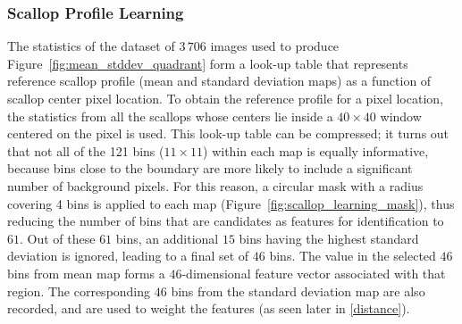 \documentclass {udthesis}
\begin{document}
\subsubsection{Scallop Profile Learning} \label{subsubsec:scallop_profile_learning}

The statistics of the dataset of $3\,706$ images used to produce Figure~\ref{fig:mean_stddev_quadrant} form a look-up table that represents reference scallop profile (mean and standard deviation maps) 
as a function of scallop center pixel location.
To obtain the reference profile for a pixel location, 
the statistics from all the scallops whose centers lie inside a $40\times40$ window centered on the pixel is used.
This look-up table can be compressed; it turns out that not all of the 121 bins ($11\times11$) within each map is equally informative, because bins close to the boundary are more likely to include a significant number of background pixels.
For this reason, a circular mask with a radius covering 4 bins is applied to each map (Figure~\ref{fig:scallop_learning_mask}), thus reducing the number of bins that are candidates as features for identification to $61$.
Out of these $61$ bins, an additional $15$ bins having the highest standard deviation is ignored, leading to a final set of $46$ bins.
The value in the selected $46$ bins from mean map forms a $46$-dimensional feature vector associated with that region. The corresponding $46$ bins from the standard deviation map are also recorded, and are used to weight the features
(as seen later in \eqref{distance}).
\end{document}
